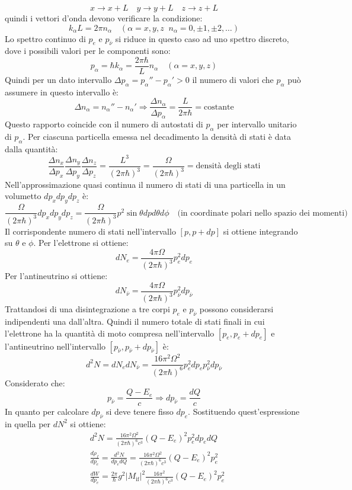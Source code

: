 \[
x\rightarrow x+L\quad y\rightarrow y+L\quad z\rightarrow z+L
\]
quindi i vettori d'onda devono verificare la condizione:
\[
k_{\alpha}L=2\pi n_{\alpha}\quad(\alpha=x,y,z\;\;n_{\alpha}=0,\pm1,\pm2,\dots)
\]
Lo spettro continuo di $p_e$ e $p_{\bar{\nu}}$ si riduce in questo caso ad uno 
spettro discreto, dove i possibili valori per le componenti sono:
\[
p_{\alpha}=\hbar k_{\alpha}=\frac{2\pi\hbar}{L}n_{\alpha}\quad(\alpha=x,y,z)
\]
Quindi per un dato intervallo $\Delta p_{\alpha}=p_{\alpha}''-p_{\alpha}'>0$ il 
numero di valori che $p_{\alpha}$ può assumere in questo intervallo è:
\[
\Delta n_{\alpha}=n_{\alpha}''-n_{\alpha}'\Rightarrow\frac{\Delta 
n_{\alpha}}{\Delta p_{\alpha}}=\frac{L}{2\pi\hbar}=\text{costante}
\]
Questo rapporto coincide con il numero di autostati di $p_{\alpha}$ per 
intervallo unitario di $p_{\alpha}$. Per ciascuna particella emessa nel 
decadimento la densità di stati è data
dalla quantità:
\[
\frac{\Delta n_x}{\Delta p_x}\frac{\Delta n_y}{\Delta p_y}\frac{\Delta 
n_z}{\Delta 
p_z}=\frac{L^3}{(2\pi\hbar)^3}=\frac{\Omega}{(2\pi\hbar)^3}=\text{densità 
degli stati}
\]
Nell'approssimazione quasi continua il numero di stati di una particella in un 
volumetto $dp_xdp_ydp_z$ è:
\[
\frac{\Omega}{(2\pi\hbar)^3}dp_xdp_ydp_z=\frac{\Omega}{(2\pi\hbar)^3}p^2\sin\theta
dpd\theta d\phi\quad\text{(in coordinate polari nello spazio dei momenti)}
\]
Il corrispondente numero di stati nell'intervallo $[p,p+dp]$ si ottiene 
integrando su $\theta$ e $\phi$. Per l'elettrone si ottiene:
\[
dN_e=\frac{4\pi\Omega}{(2\pi\hbar)^3}p_e^2dp_e
\]
Per l'antineutrino si ottiene:
\[
dN_{\bar{\nu}}=\frac{4\pi\Omega}{(2\pi\hbar)^3}p^2_{\bar{\nu}}dp_{\bar{\nu}}
\]
Trattandosi di una disintegrazione a tre corpi $p_e$ e $p_{\bar{\nu}}$ possono 
considerarsi indipendenti una dall'altra. Quindi il numero totale di stati 
finali in cui l'elettrone ha la quantità
di moto compresa nell'intervallo $[p_e,p_e+dp_e]$ e l'antineutrino 
nell'intervallo $[p_{\bar{\nu}},p_{\bar{\nu}}+dp_{\bar{\nu}}]$ è:
\[
d^2N=dN_edN_{\bar{\nu}}=\frac{16\pi^2\Omega^2}{(2\pi\hbar)^6}p_e^2dp_ep_{\bar{
\nu}}^2dp_{\bar{\nu}}
\]
Considerato che:
\[
p_{\bar{\nu}}=\frac{Q-E_e}{c}\Rightarrow dp_{\bar{\nu}}=\frac{dQ}{c}
\]
In quanto per calcolare $dp_{\bar{\nu}}$ si deve tenere fisso $dp_e$. 
Sostituendo quest'espressione in quella per $dN^2$ si ottiene:
\begin{align*}
&d^2N=\frac{16\pi^2\Omega^2}{(2\pi\hbar)^6c^3}(Q-E_e)^2p_e^2dp_edQ\\
&\frac{d\rho_f}{dp_e}=\frac{d^2N}{dp_edQ}=\frac{16\pi^2\Omega^2}{(2\pi\hbar)^6c^
3}(Q-E_e)^2p_e^2\\
&\frac{dW}{dp_e}=\frac{2\pi}{\hbar}g^2|M_{\text{if}}|^2\frac{16\pi^2}{(2\pi\hbar
)^6c^3}(Q-E_e)^2p_e^2
\end{align*}
